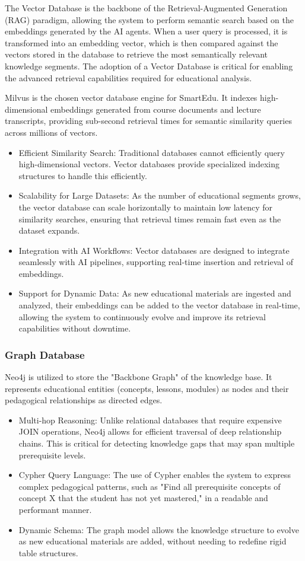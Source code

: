 The Vector Database is the backbone of the Retrieval-Augmented Generation (RAG) paradigm, allowing the system to perform semantic search based on the embeddings generated by the AI agents. When a user query is processed, it is transformed into an embedding vector, which is then compared against the vectors stored in the database to retrieve the most semantically relevant knowledge segments. The adoption of a Vector Database is critical for enabling the advanced retrieval capabilities required for educational analysis.

Milvus is the chosen vector database engine for SmartEdu. It indexes high-dimensional embeddings generated from course documents and lecture transcripts, providing sub-second retrieval times for semantic similarity queries across millions of vectors.
\begin{itemize}
    \item {Efficient Similarity Search:} Traditional databases cannot efficiently query high-dimensional vectors. Vector databases provide specialized indexing structures to handle this efficiently.
    \item {Scalability for Large Datasets:} As the number of educational segments grows, the vector database can scale horizontally to maintain low latency for similarity searches, ensuring that retrieval times remain fast even as the dataset expands.
    \item {Integration with AI Workflows:} Vector databases are designed to integrate seamlessly with AI pipelines, supporting real-time insertion and retrieval of embeddings.
    \item {Support for Dynamic Data:} As new educational materials are ingested and analyzed, their embeddings can be added to the vector database in real-time, allowing the system to continuously evolve and improve its retrieval capabilities without downtime.
\end{itemize}

\subsubsection*{Graph Database}
Neo4j is utilized to store the "Backbone Graph" of the knowledge base. It represents educational entities (concepts, lessons, modules) as nodes and their pedagogical relationships as directed edges. 
\begin{itemize}
    \item {Multi-hop Reasoning:} Unlike relational databases that require expensive JOIN operations, Neo4j allows for efficient traversal of deep relationship chains. This is critical for detecting knowledge gaps that may span multiple prerequisite levels.
    \item {Cypher Query Language:} The use of Cypher enables the system to express complex pedagogical patterns, such as "Find all prerequisite concepts of concept X that the student has not yet mastered," in a readable and performant manner.
    \item {Dynamic Schema:} The graph model allows the knowledge structure to evolve as new educational materials are added, without needing to redefine rigid table structures.
\end{itemize}

